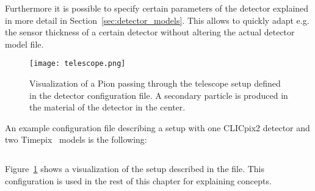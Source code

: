 Furthermore it is possible to specify certain parameters of the detector explained in more detail in Section~\ref{sec:detector_models}.
This allows to quickly adapt e.g. the sensor thickness of a certain detector without altering the actual detector model file.

\begin{figure}[t]
  \centering
  \texttt{[image: telescope.png]}
  \caption{Visualization of a Pion passing through the telescope setup defined in the detector configuration file. A secondary particle is produced in the material of the detector in the center.}
  \label{fig:telescope}
\end{figure}

An example configuration file describing a setup with one CLICpix2 detector and two Timepix~\cite{timepix} models is the following:
\inputminted[frame=single,framesep=3pt,breaklines=true,tabsize=2,linenos]{ini}{../../etc/manual_detector.conf}
Figure~\ref{fig:telescope} shows a visualization of the setup described in the file.
This configuration is used in the rest of this chapter for explaining concepts.

